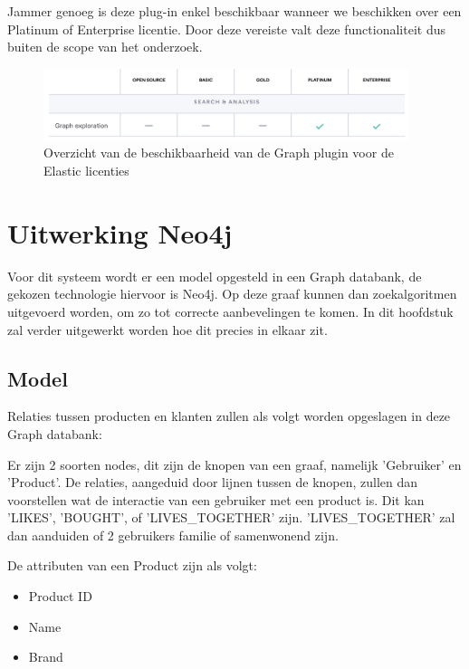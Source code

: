 Jammer genoeg is deze plug-in enkel beschikbaar wanneer we beschikken over een Platinum of Enterprise licentie. Door deze vereiste valt deze functionaliteit dus buiten de scope van het onderzoek. 

\begin{figure} [ht]
	\centering
	\includegraphics[width=0.95\textwidth]{img/elastic-license}
	\caption{Overzicht van de beschikbaarheid van de Graph plugin voor de Elastic licenties}
	\label{fig:elastic licenties overzicht graph}
\end{figure}

\newpage
\section{Uitwerking Neo4j}
\label{sec:UItwerking Neo4j}

Voor dit systeem wordt er een model opgesteld in een Graph databank, de gekozen technologie hiervoor is Neo4j. Op deze graaf kunnen dan zoekalgoritmen uitgevoerd worden, om zo tot correcte aanbevelingen te komen. In dit hoofdstuk zal verder uitgewerkt worden hoe dit precies in elkaar zit.

\subsection{Model}
\label{sec:Model}
Relaties tussen producten en klanten zullen als volgt worden opgeslagen in deze Graph databank:

Er zijn 2 soorten nodes, dit zijn de knopen van een graaf, namelijk 'Gebruiker' en 'Product'. De relaties, aangeduid door lijnen tussen de knopen, zullen dan voorstellen wat de interactie van een gebruiker met een product is. Dit kan 'LIKES', 'BOUGHT', of 'LIVES\_TOGETHER' zijn. 'LIVES\_TOGETHER' zal dan aanduiden of 2 gebruikers familie of samenwonend zijn. 

De attributen van een Product zijn als volgt:
\begin{itemize}
	\item Product ID
	\item Name
	\item Brand
\end{itemize}

